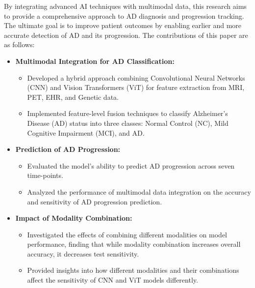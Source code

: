 By integrating advanced AI techniques with multimodal data, this research aims to provide a comprehensive approach to AD diagnosis and progression tracking. The ultimate goal is to improve patient outcomes by enabling earlier and more accurate detection of AD and its progression. The contributions of this paper are as follows:
\begin{itemize}
    \item \textbf{Multimodal Integration for AD Classification:}
    \begin{itemize}
        \item Developed a hybrid approach combining Convolutional Neural Networks (CNN) and Vision Transformers (ViT) for feature extraction from MRI, PET, EHR, and Genetic data.
        \item Implemented feature-level fusion techniques to classify Alzheimer's Disease (AD) status into three classes: Normal Control (NC), Mild Cognitive Impairment (MCI), and AD.
    \end{itemize}
    \item \textbf{Prediction of AD Progression:}
    \begin{itemize}
        \item Evaluated the model's ability to predict AD progression across seven time-points.
        \item Analyzed the performance of multimodal data integration on the accuracy and sensitivity of AD progression prediction.
    \end{itemize}
    
    \item \textbf{Impact of Modality Combination:}
    \begin{itemize}
        \item Investigated the effects of combining different modalities on model performance, finding that while modality combination increases overall accuracy, it decreases test sensitivity.
        \item Provided insights into how different modalities and their combinations affect the sensitivity of CNN and ViT models differently.
    \end{itemize}
 
\end{itemize}\ 

 